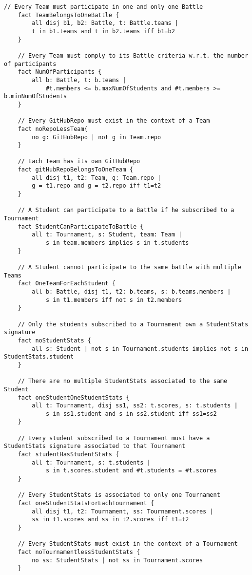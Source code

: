 \documentclass[a4paper, 11pt, titlepage]{article}
\begin{document}
\begin{lstlisting}[style=alloyStyle]
    // Every Team must participate in one and only one Battle
    fact TeamBelongsToOneBattle {
    	all disj b1, b2: Battle, t: Battle.teams |
    	t in b1.teams and t in b2.teams iff b1=b2
    }

    // Every Team must comply to its Battle criteria w.r.t. the number of participants
    fact NumOfParticipants {
    	all b: Battle, t: b.teams | 
    		#t.members <= b.maxNumOfStudents and #t.members >= b.minNumOfStudents
    }

    // Every GitHubRepo must exist in the context of a Team
    fact noRepoLessTeam{
    	no g: GitHubRepo | not g in Team.repo
    }

    // Each Team has its own GitHubRepo
    fact gitHubRepoBelongsToOneTeam {
    	all disj t1, t2: Team, g: Team.repo |
    	g = t1.repo and g = t2.repo iff t1=t2
    }

    // A Student can participate to a Battle if he subscribed to a Tournament
    fact StudentCanParticipateToBattle {
    	all t: Tournament, s: Student, team: Team |
    		s in team.members implies s in t.students
    }

    // A Student cannot participate to the same battle with multiple Teams
    fact OneTeamForEachStudent {
    	all b: Battle, disj t1, t2: b.teams, s: b.teams.members |
    		s in t1.members iff not s in t2.members
    }

    // Only the students subscribed to a Tournament own a StudentStats signature
    fact noStudentStats {
    	all s: Student | not s in Tournament.students implies not s in StudentStats.student 
    }

    // There are no multiple StudentStats associated to the same Student
    fact oneStudentOneStudentStats {
    	all t: Tournament, disj ss1, ss2: t.scores, s: t.students |
    		s in ss1.student and s in ss2.student iff ss1=ss2		
    }

    // Every student subscribed to a Tournament must have a StudentStats signature associated to that Tournament
    fact studentHasStudentStats {
    	all t: Tournament, s: t.students |
    		s in t.scores.student and #t.students = #t.scores
    }

    // Every StudentStats is associated to only one Tournament
    fact oneStudentStatsForEachTournament {
    	all disj t1, t2: Tournament, ss: Tournament.scores |
    	ss in t1.scores and ss in t2.scores iff t1=t2
    }

    // Every StudentStats must exist in the context of a Tournament
    fact noTournamentlessStudentStats {
    	no ss: StudentStats | not ss in Tournament.scores
    }


\end{lstlisting}
\end{document}
